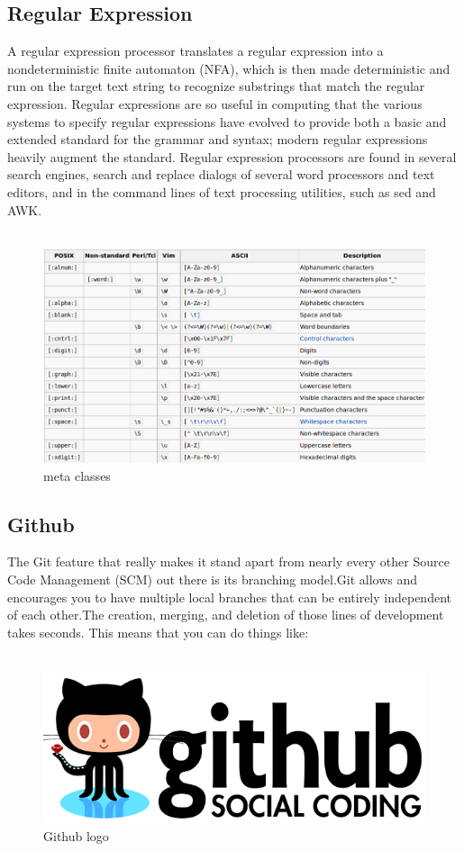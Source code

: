 \subsection{Regular Expression}
A regular expression processor translates a regular expression into a nondeterministic finite automaton (NFA), which is then made deterministic and run on the target text string to recognize substrings that match the regular expression. Regular expressions are so useful in computing that the various systems to specify regular expressions have evolved to provide both a basic and extended standard for the grammar and syntax; modern regular expressions heavily augment the standard. Regular expression processors are found in several search engines, search and replace dialogs of several word processors and text editors, and in the command lines of text processing utilities, such as sed and AWK.\\\\
\begin{figure} [h!]
\centering
\includegraphics[scale=0.3]{images/regx.png}
\caption{meta classes}
\end{figure}

\subsection{Github}
The Git feature that really makes it stand apart from nearly every other Source Code
Management (SCM) out there is its branching model.Git allows and encourages you to
have multiple local branches that can be entirely independent of each other.The creation,
merging, and deletion of those lines of development takes seconds. This means that you
can do things like:\\\\

\begin{figure} [h]
\centering
\includegraphics[scale=0.3]{images/github.png}
\caption{Github logo}
\end{figure}

